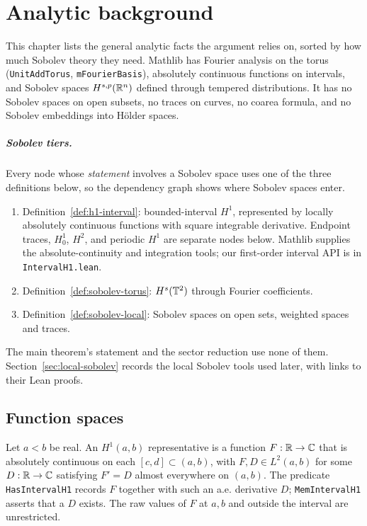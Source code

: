 \chapter{Analytic background}
\label{chap:analysis}

This chapter lists the general analytic facts the argument relies on, sorted
by how much Sobolev theory they need. Mathlib has Fourier analysis on the torus
(\texttt{UnitAddTorus}, \texttt{mFourierBasis}), absolutely continuous
functions on intervals, and Sobolev spaces $H^{s,p}(\mathbb{R}^n)$ defined through
tempered distributions. It has no Sobolev spaces on open subsets, no traces on
curves, no coarea formula, and no Sobolev embeddings into H\"older spaces.

\paragraph{Sobolev tiers.} Every node whose \emph{statement} involves a Sobolev
space uses one of the three definitions below, so the dependency graph shows
where Sobolev spaces enter.
\begin{enumerate}
  \item Definition~\ref{def:h1-interval}: bounded-interval $H^1$, represented
        by locally absolutely continuous functions with square integrable
        derivative. Endpoint traces, $H^1_0$, $H^2$, and periodic $H^1$ are
        separate nodes below. Mathlib supplies the absolute-continuity and
        integration tools; our first-order interval API is in
        \texttt{IntervalH1.lean}.
  \item Definition~\ref{def:sobolev-torus}: $H^s(\mathbb{T}^2)$ through Fourier
        coefficients.
  \item Definition~\ref{def:sobolev-local}: Sobolev spaces on open sets,
        weighted spaces and traces.
\end{enumerate}
The main theorem's statement and the sector reduction use none of them.
Section~\ref{sec:local-sobolev} records the local Sobolev tools used later,
with links to their Lean proofs.

\section{Function spaces}

\begin{definition}
\label{def:h1-interval}
\leanok
Let $a<b$ be real. An $H^1(a,b)$ representative is a function $F:\mathbb{R}\to\mathbb{C}$
that is absolutely continuous on each $[c,d]\subset(a,b)$, with
$F,D\in L^2(a,b)$ for some $D:\mathbb{R}\to\mathbb{C}$ satisfying $F'=D$ almost everywhere
on $(a,b)$. The predicate \texttt{HasIntervalH1} records $F$ together with
such an a.e. derivative $D$; \texttt{MemIntervalH1} asserts that a $D$ exists.
The raw values of $F$ at $a,b$ and outside the interval are unrestricted.
\end{definition}

